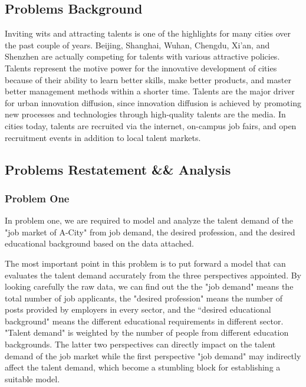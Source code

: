 \documentclass{mcmthesis}
\begin{document}
\subsection{Problems Background}
Inviting wits and attracting talents is one of the highlights for many cities over the past couple of years. Beijing, Shanghai, Wuhan, Chengdu, Xi'an, and Shenzhen are actually competing for talents with various attractive policies. Talents represent the motive power for the innovative development of cities because of their ability to learn better skills, make better products, and master better management methods within a shorter time. Talents are the major driver for urban innovation diffusion, since innovation diffusion is achieved by promoting new processes and technologies through high-quality talents are the media. In cities today, talents are recruited via the internet, on-campus job fairs, and open recruitment events in addition to local talent markets.




%

\subsection{Problems Restatement \&\& Analysis}
\subsubsection{Problem One}
In problem one, we are required to model and analyze the talent demand of the "job market of A-City" from job demand, the desired profession, and the desired educational background based on the data attached. \par\noindent
The most important point in this problem is to put forward a model that can evaluates the talent demand accurately from the three perspectives appointed. By looking carefully the raw data, we can find out the the "job demand" means the total number of job applicants, the "desired profession" means the number of posts provided by employers in every sector, and the ``desired educational background" means the different educational requirements in different sector. "Talent demand" is weighted by the number of people from different education backgrounds. The latter two perspectives can directly impact on the talent demand of the job market while the first perspective "job demand" may indirectly affect the talent demand, which become a stumbling block for establishing a suitable model.
\end{document}
